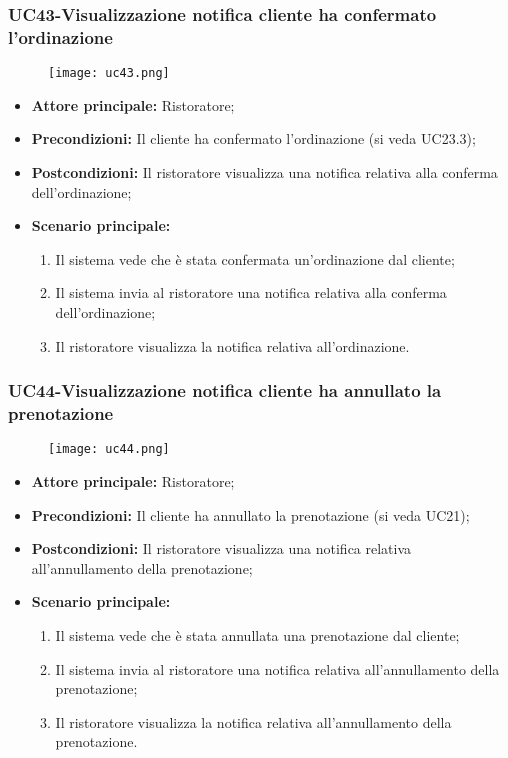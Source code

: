 \subsubsection{UC43-Visualizzazione notifica cliente ha confermato l'ordinazione}
\begin{figure}[h] \texttt{[image: uc43.png]} \end{figure}
\begin{itemize}
\item \textbf{Attore principale:} Ristoratore;
\item \textbf{Precondizioni:} Il cliente ha confermato l'ordinazione (si veda UC23.3);
\item \textbf{Postcondizioni:} Il ristoratore visualizza una notifica relativa alla conferma dell'ordinazione;
\item \textbf{Scenario principale:}
\begin{enumerate}
    \item Il sistema vede che è stata confermata un'ordinazione dal cliente;
    \item Il sistema invia al ristoratore una notifica relativa alla conferma dell'ordinazione;
    \item Il ristoratore visualizza la notifica relativa all'ordinazione.
\end{enumerate}
\end{itemize}

\subsubsection{UC44-Visualizzazione notifica cliente ha annullato la prenotazione}
\begin{figure}[h] \texttt{[image: uc44.png]} \end{figure}
\begin{itemize}
\item \textbf{Attore principale:} Ristoratore;
\item \textbf{Precondizioni:} Il cliente ha annullato la prenotazione (si veda UC21);
\item \textbf{Postcondizioni:} Il ristoratore visualizza una notifica relativa all'annullamento della prenotazione;
\item \textbf{Scenario principale:}
\begin{enumerate}
    \item Il sistema vede che è stata annullata una prenotazione dal cliente;
    \item Il sistema invia al ristoratore una notifica relativa all'annullamento della prenotazione;
    \item Il ristoratore visualizza la notifica relativa all'annullamento della prenotazione.
\end{enumerate}
\end{itemize}

